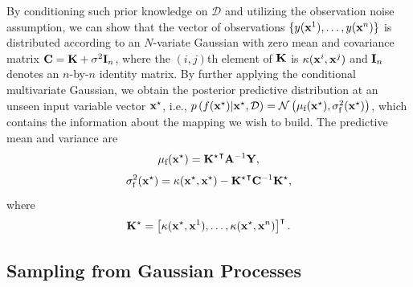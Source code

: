 \documentclass{article}
\begin{document}
By conditioning such prior knowledge on $\mathcal{D}$ and utilizing the observation noise assumption, we can show that the vector of observations $\{y({\bf x}^1),\dots,y({\bf x}^n)\}$ is distributed according to an $N$-variate Gaussian with zero mean and covariance matrix ${\bf C} = {\bf K} + \sigma^2 {\bf I}_n$, where the $(i,j)$th element of ${\bf K}$ is $\kappa({\bf x}^i,{\bf x}^j)$ and ${\bf I}_n$ denotes an $n$-by-$n$ identity matrix.
By further applying the conditional multivariate Gaussian, we obtain the posterior predictive distribution at an unseen input variable vector ${\bf x}^\star$, i.e., $p\left(f({\bf x}^\star)|{\bf x}^\star,\mathcal{D}\right) = \mathcal{N}\left(\mu_\text{f}({\bf x}^\star),\sigma_\text{f}^2({\bf x}^\star)\right)$, which contains the information about the mapping we wish to build. The predictive mean and variance are 
% 
\begin{equation}\label{eqn2}
	\mu_\text{f}({\bf x}^\star)= {\bf K^\star}^\intercal {\bf A}^{-1} {\bf Y},
\end{equation}
% 
\begin{equation}\label{eqn3}
	\sigma_\text{f}^2({\bf x}^\star)=\kappa({\bf x}^\star,{\bf x}^\star)
	-{\bf K^\star}^\intercal {\bf C}^{-1} {\bf K^\star},
\end{equation}
where
% 
\begin{equation}\label{eqn4}
	{\bf K^\star} = \left[\kappa({\bf x}^\star,{\bf x}^1),\dots,\kappa({\bf x}^\star,{\bf x}^n)\right]^\intercal.
\end{equation}

\subsection{Sampling from Gaussian Processes}
\end{document}

